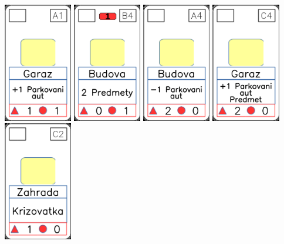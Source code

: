 \documentclass[a4paper]{article}
\begin{document}
	\includegraphics[width=3.0cm]{img-2_15}
	\includegraphics[width=3.0cm]{img-2_8}
	\includegraphics[width=3.0cm]{img-2_3}
	\includegraphics[width=3.0cm]{img-2_13}
	\includegraphics[width=3.0cm]{img-2_26}
\end{document}
